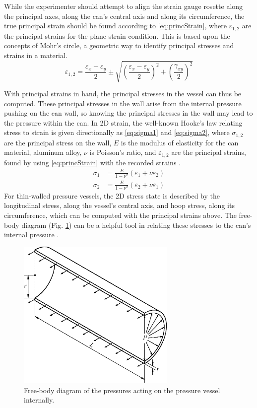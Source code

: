 \documentclass[10pt,journal,letterpaper]{IEEEtran}
\begin{document}
While the experimenter should attempt to align the strain gauge rosette along the principal axes, along the can's central axis and along its circumference, the true principal strain should be found according to \eqref{eq:princStrain}, where $\varepsilon_{1,2}$ are the principal strains for the plane strain condition.
This is based upon the concepts of Mohr’s circle, a geometric way to identify principal stresses and strains in a material.
\begin{equation}
\label{eq:princStrain}
\varepsilon_{1,2}=\frac{\varepsilon_x+\varepsilon_y}{2} \pm \sqrt{\left(\frac{\varepsilon_x-\varepsilon_y}{2}\right)^2+\left(\frac{\gamma_{xy}}{2}\right)^2}
\end{equation}

With principal strains in hand, the principal stresses in the vessel can thus be computed.
These principal stresses in the wall arise from the internal pressure pushing on the can wall, so knowing the principal stresses in the wall may lead to the pressure within the can.
In 2D strain, the well-known Hooke’s law relating stress to strain is given directionally as \eqref{eq:sigma1} and \eqref{eq:sigma2}, where $\sigma_{1,2}$ are the principal stress on the wall, $E$ is the modulus of elasticity for the can material, aluminum alloy, $\nu$ is Poisson’s ratio, and $\varepsilon_{1,2}$ are the principal strains, found by using \eqref{eq:princStrain} with the recorded strains \cite{b1}.
\begin{subequations}
\begin{align}
\sigma_1&=\frac{E}{1-\nu^2}\left(\varepsilon_1+\nu\varepsilon_2\right) \label{eq:sigma1} \\
\sigma_2&=\frac{E}{1-\nu^2}\left(\varepsilon_2+\nu\varepsilon_1\right) \label{eq:sigma2}
\end{align}
\end{subequations}
For thin-walled pressure vessels, the 2D stress state is described by the longitudinal stress, along the vessel's central axis, and hoop stress, along its circumference, which can be computed with the principal strains above.
The free-body diagram (Fig. \ref{fig:PVessel}) can be a helpful tool in relating these stresses to the can's internal pressure \cite{b1}.

\begin{figure}[H]
\centering
\includegraphics[width=3in]{PVessel}
\caption{Free-body diagram of the pressures acting on the pressure vessel internally.}
\label{fig:PVessel}
\end{figure}
\end{document}

